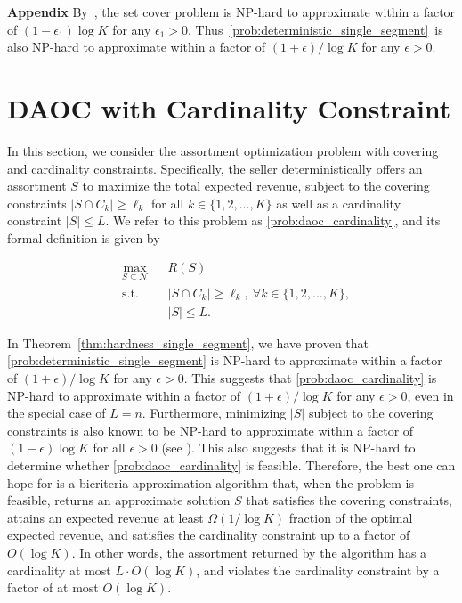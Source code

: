 \documentclass[msom,non-blindrev]{informs3} %
\theoremstyle{definition}
\begin{document}
\begin{appendices}{\Large \noindent\textbf{Appendix}}
	By~\cite{dinur2014analytical}, the set cover problem is NP-hard to approximate within a factor of $(1-\epsilon_1)\log K$ for any $\epsilon_1>0$. Thus~\eqref{prob:deterministic_single_segment}~is also NP-hard to approximate within a factor of $(1+\epsilon)/\log K$ for any $\epsilon>0$.

{ 

\section{DAOC with Cardinality Constraint}\label{sec:daoc_cardinality}

In this section, we consider the assortment optimization problem with covering and cardinality constraints. Specifically, the seller deterministically offers an assortment $S$ to maximize the total expected revenue, subject to the covering constraints $|S\cap C_k|\geq\ell_k$ for all $k\in\{1,2,\dots,K\}$ as well as a cardinality constraint $|S|\leq L$. We refer to this problem as \eqref{prob:daoc_cardinality}, and its formal definition is given by

\begin{equation}\tag{DAOC-Cardinality}\label{prob:daoc_cardinality}
\begin{aligned}
&\max_{S\subseteq\mathcal{N}}&&R(S)\\
&\text{s.t.}&&|S\cap C_k|\geq \ell_k,\ \forall k\in\{1,2,\dots,K\},\\
&&&|S|\leq L.
\end{aligned}
\end{equation}

In Theorem~\ref{thm:hardness_single_segment}, we have proven that \eqref{prob:deterministic_single_segment} is NP-hard to approximate within a factor of $(1+\epsilon)/\log K$ for any $\epsilon>0$. This suggests that \eqref{prob:daoc_cardinality} is NP-hard to approximate within a factor of $(1+\epsilon)/\log K$ for any $\epsilon>0$, even in the special case of $L=n$. Furthermore, minimizing $|S|$ subject to the covering constraints is also known to be NP-hard to approximate within a factor of $(1-\epsilon)\log K$ for all $\epsilon>0$ (see \citealt{dinur2014analytical}). This also suggests that it is NP-hard to determine whether \eqref{prob:daoc_cardinality} is feasible. Therefore, the best one can hope for is a bicriteria approximation algorithm that, when the problem is feasible, returns an approximate solution $S$ that satisfies the covering constraints, attains an expected revenue at least $\Omega(1/\log K)$ fraction of the optimal expected revenue, and satisfies the cardinality constraint up to a factor of $O(\log K)$. In other words, the assortment returned by the algorithm has a cardinality at most $L\cdot O(\log K)$, and violates the cardinality constraint by a factor of at most $O(\log K)$.

}
\end{appendices}
\end{document}
